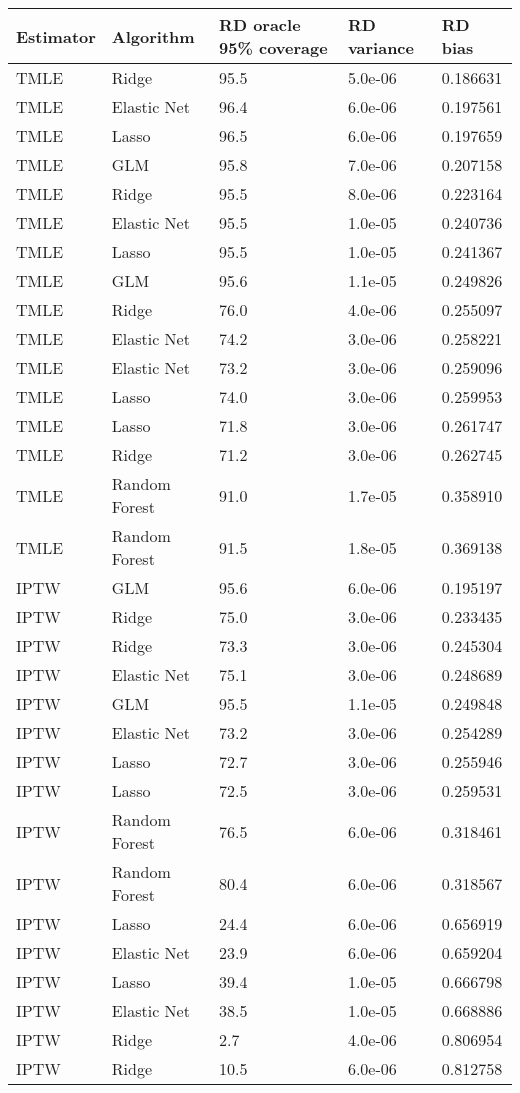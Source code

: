 
\begin{longtable}[l]{lllll}
\toprule
Estimator & Algorithm & RD oracle 95\% coverage & RD variance & RD bias\\
\midrule
TMLE & Ridge & 95.5 & 5.0e-06 & 0.186631\\
TMLE & Elastic Net & 96.4 & 6.0e-06 & 0.197561\\
TMLE & Lasso & 96.5 & 6.0e-06 & 0.197659\\
TMLE & GLM & 95.8 & 7.0e-06 & 0.207158\\
TMLE & Ridge & 95.5 & 8.0e-06 & 0.223164\\
TMLE & Elastic Net & 95.5 & 1.0e-05 & 0.240736\\
TMLE & Lasso & 95.5 & 1.0e-05 & 0.241367\\
TMLE & GLM & 95.6 & 1.1e-05 & 0.249826\\
TMLE & Ridge & 76.0 & 4.0e-06 & 0.255097\\
TMLE & Elastic Net & 74.2 & 3.0e-06 & 0.258221\\
TMLE & Elastic Net & 73.2 & 3.0e-06 & 0.259096\\
TMLE & Lasso & 74.0 & 3.0e-06 & 0.259953\\
TMLE & Lasso & 71.8 & 3.0e-06 & 0.261747\\
TMLE & Ridge & 71.2 & 3.0e-06 & 0.262745\\
TMLE & Random Forest & 91.0 & 1.7e-05 & 0.358910\\
TMLE & Random Forest & 91.5 & 1.8e-05 & 0.369138\\
IPTW & GLM & 95.6 & 6.0e-06 & 0.195197\\
IPTW & Ridge & 75.0 & 3.0e-06 & 0.233435\\
IPTW & Ridge & 73.3 & 3.0e-06 & 0.245304\\
IPTW & Elastic Net & 75.1 & 3.0e-06 & 0.248689\\
IPTW & GLM & 95.5 & 1.1e-05 & 0.249848\\
IPTW & Elastic Net & 73.2 & 3.0e-06 & 0.254289\\
IPTW & Lasso & 72.7 & 3.0e-06 & 0.255946\\
IPTW & Lasso & 72.5 & 3.0e-06 & 0.259531\\
IPTW & Random Forest & 76.5 & 6.0e-06 & 0.318461\\
IPTW & Random Forest & 80.4 & 6.0e-06 & 0.318567\\
IPTW & Lasso & 24.4 & 6.0e-06 & 0.656919\\
IPTW & Elastic Net & 23.9 & 6.0e-06 & 0.659204\\
IPTW & Lasso & 39.4 & 1.0e-05 & 0.666798\\
IPTW & Elastic Net & 38.5 & 1.0e-05 & 0.668886\\
IPTW & Ridge & 2.7 & 4.0e-06 & 0.806954\\
IPTW & Ridge & 10.5 & 6.0e-06 & 0.812758\\
\bottomrule
\end{longtable}
